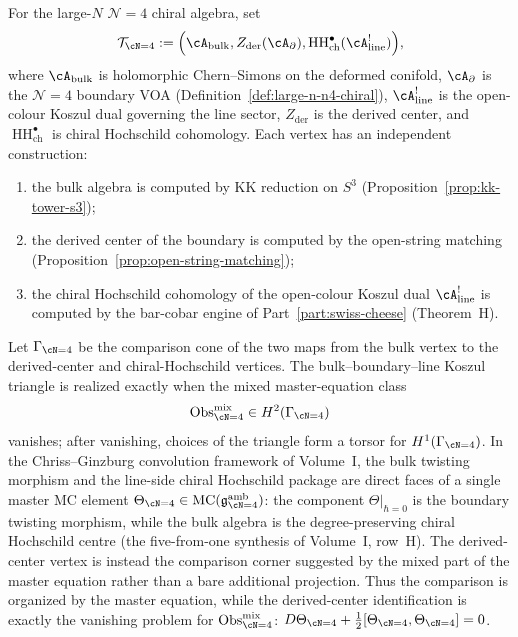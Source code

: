 \begin{proposition}[The Koszul comparison criterion for $\mathcal{N}=4$]
\label{prop:n4-koszul-comparison-criterion}
For the large-$N$ $\mathcal{N}=4$ chiral algebra, set
\begin{equation}\label{eq:n4-koszul-triangle}
\mathcal T_{\cN=4}
:=
\Bigl(
 \cA_{\mathrm{bulk}},
 Z_{\mathrm{der}}(\cA_{\partial}),
 \operatorname{HH}^\bullet_{\mathrm{ch}}(\cA^!_{\mathrm{line}})
\Bigr),
\end{equation}
where $\cA_{\mathrm{bulk}}$ is holomorphic Chern--Simons on the
deformed conifold, $\cA_\partial$ is the $\mathcal{N}=4$ boundary VOA
(Definition~\ref{def:large-n-n4-chiral}), $\cA^!_{\mathrm{line}}$ is
the open-colour Koszul dual governing the line sector,
$Z_{\mathrm{der}}$ is the derived center, and
$\operatorname{HH}^\bullet_{\mathrm{ch}}$ is chiral Hochschild
cohomology. Each vertex has an independent construction:
\begin{enumerate}[label=\textup{(\roman*)},nosep]
\item the bulk algebra is computed by KK reduction on $S^3$
 (Proposition~\ref{prop:kk-tower-s3});
\item the derived center of the boundary is computed by the open-string
 matching (Proposition~\ref{prop:open-string-matching});
\item the chiral Hochschild cohomology of the open-colour Koszul dual
 $\cA^!_{\mathrm{line}}$ is computed by the bar-cobar engine of
 Part~\ref{part:swiss-cheese} (Theorem~H).
\end{enumerate}
Let $\Gamma_{\cN=4}$ be the comparison cone of the two maps from the bulk vertex to the
derived-center and chiral-Hochschild vertices. The bulk--boundary--line Koszul triangle is
realized exactly when the mixed master-equation class
\[
\Obs_{\cN=4}^{\mathrm{mix}}\in H^2(\Gamma_{\cN=4})
\]
vanishes; after vanishing, choices of the triangle form a torsor for
$H^1(\Gamma_{\cN=4})$.
In the Chriss--Ginzburg convolution framework of Volume~I,
the bulk twisting morphism and the line-side chiral Hochschild
package are direct faces of a single master MC element
$\Theta_{\cN=4} \in
\operatorname{MC}(\mathfrak{g}^{\mathrm{amb}}_{\cN=4})$:
the component $\Theta\big|_{\hbar=0}$ is the boundary twisting
morphism, while the bulk algebra is the degree-preserving chiral
Hochschild centre
\textup{(}the five-from-one synthesis of Volume~I, row~H\textup{)}.
The derived-center vertex is instead the comparison corner suggested
by the mixed part of the master equation rather than a bare
additional projection. Thus the comparison is organized by the master equation, while the
derived-center identification is exactly the vanishing problem for
$\Obs_{\cN=4}^{\mathrm{mix}}$:
$D\Theta_{\cN=4} + \tfrac{1}{2}[\Theta_{\cN=4},\Theta_{\cN=4}] = 0$.
\end{proposition}


